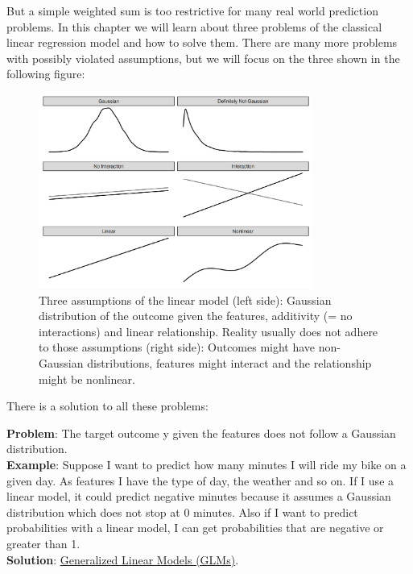 \documentclass[
  11pt,
]{scrbook}
\begin{document}
But a simple weighted sum is too restrictive for many real world prediction problems.
In this chapter we will learn about three problems of the classical linear regression model and how to solve them.
There are many more problems with possibly violated assumptions, but we will focus on the three shown in the following figure:

\begin{figure}

{\centering \includegraphics[width=0.8\textwidth]{images/three-lm-problems-1} 

}

\caption{Three assumptions of the linear model (left side): Gaussian distribution of the outcome given the features, additivity (= no interactions) and linear relationship. Reality usually does not adhere to those assumptions (right side): Outcomes might have non-Gaussian distributions, features might interact and the relationship might be nonlinear.}\label{fig:three-lm-problems}
\end{figure}

There is a solution to all these problems:

\textbf{Problem}: The target outcome y given the features does not follow a Gaussian distribution.\\
\textbf{Example}: Suppose I want to predict how many minutes I will ride my bike on a given day.
As features I have the type of day, the weather and so on.
If I use a linear model, it could predict negative minutes because it assumes a Gaussian distribution which does not stop at 0 minutes.
Also if I want to predict probabilities with a linear model, I can get probabilities that are negative or greater than 1.\\
\textbf{Solution}: \protect\hyperlink{glm}{Generalized Linear Models (GLMs)}.
\end{document}
